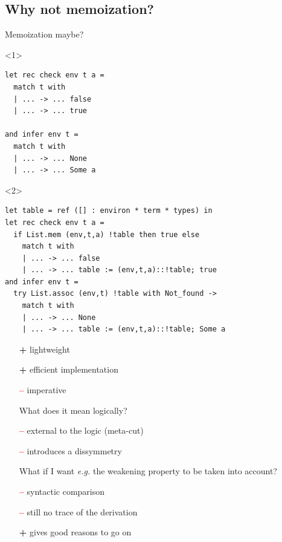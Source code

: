 \documentclass[ignorenonframetext,red]{beamer}
\newcommand\jwf[1]{{#1}\ \mathsf{wf}}
\newcommand\To{\Rightarrow}
\newcommand\itplus{\textcolor{green!60!black}{\textbf{\textsf{+}}}}
\newcommand\itminus{\textcolor{red}{\textbf{\textsf{--}}}}
\begin{document}
\subsection{Why not memoization?}

\begin{frame}[fragile]{Memoization maybe?}
  \begin{onlyenv}<1>
    \vspace{4em}
\begin{lstlisting}
let rec check env t a = 
  match t with
  | ... -> ... false
  | ... -> ... true

and infer env t =
  match t with 
  | ... -> ... None
  | ... -> ... Some a
\end{lstlisting}
  \end{onlyenv}
  \begin{onlyenv}<2>
    \vspace{3em}
\begin{lstlisting}
let table = ref ([] : environ * term * types) in
let rec check env t a = 
  if List.mem (env,t,a) !table then true else
    match t with
    | ... -> ... false
    | ... -> ... table := (env,t,a)::!table; true
and infer env t =
  try List.assoc (env,t) !table with Not_found ->
    match t with 
    | ... -> ... None
    | ... -> ... table := (env,t,a)::!table; Some a
\end{lstlisting}
  \end{onlyenv}
  \pause\pause
  \begin{enumerate}[<+->]
  \item[\itplus] lightweight
  \item[\itplus] efficient implementation
  \item[\itminus] imperative
  \item[] \footnotesize What does it mean logically?
  \item[\itminus] external to the logic (meta-cut)
  \item[\itminus] introduces a dissymmetry
  \item[] \footnotesize What if I want \emph{e.g.} the weakening property to be taken into account?
  \item [\itminus] syntactic comparison
  \item[\itminus] still no trace of the derivation
  \item[\itplus] gives good reasons to go on
  \end{enumerate}
\end{frame}
\end{document}
